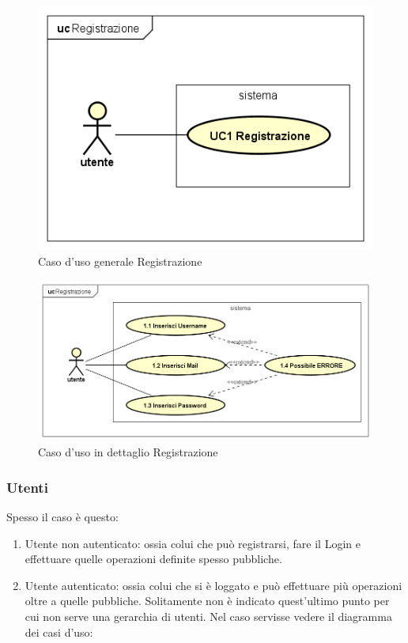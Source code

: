 \documentclass[a4paper,11pt]{article}
\begin{document}
				\begin{figure} [h]
					\centering
					\includegraphics[scale=0.5]{UseCasePattern/Registrazione/Registrazione}
					\caption{Caso d'uso generale Registrazione}
					
				\end{figure}
				
				\begin{figure} [h]
					\centering
					\includegraphics[scale=0.5]{UseCasePattern/Registrazione/RegistrazioneDettaglio}
					\caption{Caso d'uso in dettaglio Registrazione}
				\end{figure}
	
	\newpage
	\subsubsection{Utenti} 
	Spesso il caso è questo:
		\begin{enumerate}
			\item Utente non autenticato: ossia colui che può registrarsi, fare il Login e effettuare quelle operazioni definite spesso pubbliche.
			\item Utente autenticato: ossia colui che si è loggato e può effettuare più operazioni oltre a quelle pubbliche. Solitamente non è indicato quest'ultimo punto per cui non serve una gerarchia di utenti. Nel caso servisse vedere il diagramma dei casi d'uso:
		\end{enumerate}								
					
\end{document}
